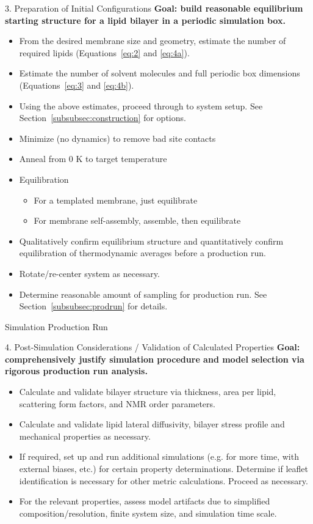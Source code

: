 \documentclass[9pt,bestpractices,pubversion]{livecoms}
\begin{document}
\begin{Checklists*}[p!]
\begin{checklist}{3. Preparation of Initial Configurations}
\textbf{Goal: build reasonable equilibrium starting structure for a lipid bilayer in a periodic simulation box.}
\begin{itemize}
\item From the desired membrane size and geometry, estimate the number of required lipids (Equations~\ref{eq:2} and \ref{eq:4a}).
\item Estimate the number of solvent molecules and full periodic box dimensions (Equations~\ref{eq:3} and \ref{eq:4b}).
\item Using the above estimates, proceed through to system setup. See Section~\ref{subsubsec:construction} for options.
\item Minimize (no dynamics) to remove bad site contacts
\item Anneal from 0 K to target temperature
\item Equilibration
	\begin{itemize}
	\item For a templated membrane, just equilibrate
	\item For membrane self-assembly, assemble, then equilibrate
	\end{itemize}
\item Qualitatively confirm equilibrium structure and quantitatively confirm equilibration of thermodynamic averages before a production run.
\item Rotate/re-center system as necessary.
\item Determine reasonable amount of sampling for production run. See Section~\ref{subsubsec:prodrun} for details.
\end{itemize}
\end{checklist}

\begin{checklist}{Simulation Production Run}
\end{checklist}

\begin{checklist}{4. Post-Simulation Considerations / Validation of Calculated Properties}
\textbf{Goal: comprehensively justify simulation procedure and model selection via rigorous production run analysis.}
\begin{itemize}
\item Calculate and validate bilayer structure via thickness, area per lipid, scattering form factors, and NMR order parameters.
\item Calculate and validate lipid lateral diffusivity, bilayer stress profile and mechanical properties as necessary.
\item If required, set up and run additional simulations (e.g. for more time, with external biases, etc.) for certain property determinations. Determine if leaflet identification is necessary for other metric calculations. Proceed as necessary.
\item For the relevant properties, assess model artifacts due to simplified composition/resolution, finite system size, and simulation time scale.
\end{itemize}
\end{checklist}


\end{Checklists*}
\end{document}
